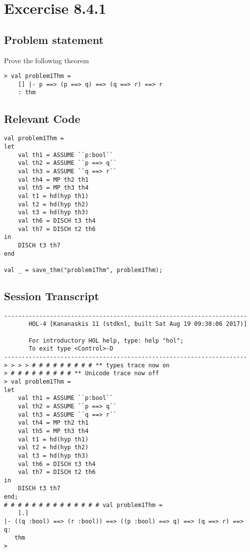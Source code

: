 \documentclass{report}
\begin{document}
\chapter{Excercise 8.4.1}
\label{cha:8.4.1}

\section{Problem statement}
\label{problem-statement-8-4-1}
Prove the following theorem
\begin{lstlisting}[frame=tblr]
> val problem1Thm =
	[] |- p ==> (p ==> q) ==> (q ==> r) ==> r
	: thm
\end{lstlisting}

\section{Relevant Code}
\label{rel-code-8-4-1}
\begin{lstlisting}[frame=TBlr]
val problem1Thm =
let
	val th1 = ASSUME ``p:bool``
	val th2 = ASSUME ``p ==> q``
	val th3 = ASSUME ``q ==> r``
	val th4 = MP th2 th1
	val th5 = MP th3 th4
	val t1 = hd(hyp th1)
	val t2 = hd(hyp th2)
	val t3 = hd(hyp th3)
	val th6 = DISCH t3 th4
	val th7 = DISCH t2 th6
in
	DISCH t3 th7
end

val _ = save_thm("problem1Thm", problem1Thm);

\end{lstlisting}

\section{Session Transcript}
\label{trans-8-4-1}
\begin{session}
  \begin{scriptsize}
\begin{verbatim}
---------------------------------------------------------------------
       HOL-4 [Kananaskis 11 (stdknl, built Sat Aug 19 09:30:06 2017)]

       For introductory HOL help, type: help "hol";
       To exit type <Control>-D
---------------------------------------------------------------------
> > > > # # # # # # # # # ** types trace now on
> # # # # # # # # # ** Unicode trace now off
> val problem1Thm =
let
	val th1 = ASSUME ``p:bool``
	val th2 = ASSUME ``p ==> q``
	val th3 = ASSUME ``q ==> r``
	val th4 = MP th2 th1
	val th5 = MP th3 th4
	val t1 = hd(hyp th1)
	val t2 = hd(hyp th2)
	val t3 = hd(hyp th3)
	val th6 = DISCH t3 th4
	val th7 = DISCH t2 th6
in
	DISCH t3 th7
end;
# # # # # # # # # # # # # # val problem1Thm =
    [.]
|- ((q :bool) ==> (r :bool)) ==> ((p :bool) ==> q) ==> (q ==> r) ==> q:
   thm
> 
\end{verbatim}
  \end{scriptsize}
\end{session}
\end{document}
